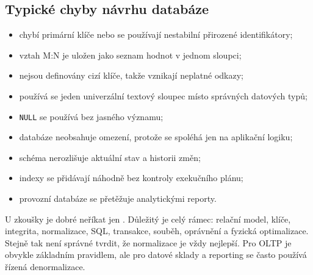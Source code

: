 \subsection{Typické chyby návrhu databáze}
\begin{itemize}
  \item chybí primární klíče nebo se používají nestabilní přirozené identifikátory;
  \item vztah M:N je uložen jako seznam hodnot v jednom sloupci;
  \item nejsou definovány cizí klíče, takže vznikají neplatné odkazy;
  \item používá se jeden univerzální textový sloupec místo správných datových typů;
  \item \texttt{NULL} se používá bez jasného významu;
  \item databáze neobsahuje omezení, protože se spoléhá jen na aplikační logiku;
  \item schéma nerozlišuje aktuální stav a historii změn;
  \item indexy se přidávají náhodně bez kontroly exekučního plánu;
  \item provozní databáze se přetěžuje analytickými reporty.
\end{itemize}

\pozor
U zkoušky je dobré neříkat jen . Důležitý je celý rámec: relační model,
klíče, integrita, normalizace, SQL, transakce, souběh, oprávnění a fyzická optimalizace. Stejně tak
není správné tvrdit, že normalizace je vždy nejlepší. Pro OLTP je obvykle základním pravidlem, ale
pro datové sklady a reporting se často používá řízená denormalizace.

